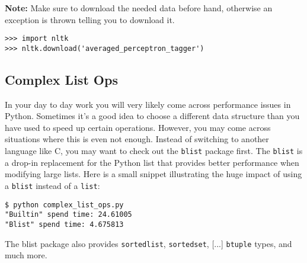\textbf{Note:} Make sure to download the needed data before hand, otherwise an exception is thrown telling you to download it.

\begin{lstlisting}[caption=Download data using NLTK]
>>> import nltk
>>> nltk.download('averaged_perceptron_tagger')
\end{lstlisting}


\subsection{Complex List Ops}

In your day to day work you will very likely come across performance issues in Python.
Sometimes it's a good idea to choose a different data structure than you have used to speed up certain operations.
However, you may come across situations where this is even not enough.
Instead of switching to another language like C, you may want to check out the \lstinline{blist} package first.
\glqq The \lstinline{blist} is a drop-in replacement for the Python list that provides better performance when modifying large lists.\grqq
Here is a small snippet illustrating the huge impact of using a \lstinline{blist} instead of a \lstinline{list}:



\begin{lstlisting}[caption=Output of complex\_list\_ops.py]
$ python complex_list_ops.py
"Builtin" spend time: 24.61005
"Blist" spend time: 4.675813
\end{lstlisting}

\glqq The blist package also provides \lstinline{sortedlist}, \lstinline{sortedset}, [...] \lstinline{btuple} types\grqq , and much more.
